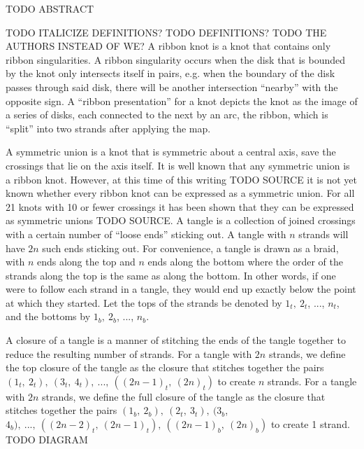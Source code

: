 

\begin{paperabstract}
TODO ABSTRACT
\end{paperabstract}
\begin{paper}
\theorems
TODO ITALICIZE DEFINITIONS?
TODO DEFINITIONS?
TODO THE AUTHORS INSTEAD OF WE?
A ribbon knot is a knot that contains only ribbon singularities.
A ribbon singularity occurs when the disk that is bounded by the knot only
intersects itself in pairs, e.g. when the boundary of the disk passes through
said disk, there will be another intersection ``nearby'' with the opposite sign.
A ``ribbon presentation'' for a knot depicts the knot as the image of a series
of disks, each connected to the next by an arc, the ribbon, which is ``split''
into two strands after applying the map.

A symmetric union is a knot that is symmetric about a central axis, save the
crossings that lie on the axis itself.
It is well known that any symmetric union is a ribbon knot.
However, at this time of this writing TODO SOURCE it is not yet known whether
every ribbon knot can be expressed as a symmetric union.
For all 21 knots with 10 or fewer crossings it has been shown that they can be
expressed as symmetric unions TODO SOURCE.
A tangle is a collection of joined crossings with a certain number of ``loose
ends'' sticking out.
A tangle with $n$ strands will have $2n$ such ends sticking out.
For convenience, a tangle is drawn as a braid, with $n$ ends along the top and
$n$ ends along the bottom where the order of the strands along the top is the
same as along the bottom.
In other words, if one were to follow each strand in a tangle, they would end up
exactly below the point at which they started.
Let the tops of the strands be denoted by $1_t,~2_t$, ..., $n_t$, and the
bottoms  by $1_b,~2_b$, ..., $n_b$.


A closure of a tangle is a manner of stitching the ends of the tangle together
to reduce the resulting number of strands.
For a tangle with $2n$ strands, we define the top closure of the tangle as the
closure that stitches together the pairs
$(1_t,~2_t),~(3_t,~4_t),~...,~((2n-1)_t,~(2n)_t)$ to create $n$ strands.
For a tangle with $2n$ strands, we define the full closure of the tangle as the
closure that stitches together the pairs $(1_b,~2_b),~(2_t,~3_t),~(3_b$,
$4_b),~...,~((2n-2)_t,~(2n-1)_t),~((2n-1)_b,~(2n)_b)$ to create 1 strand.
TODO DIAGRAM


\end{paper}
